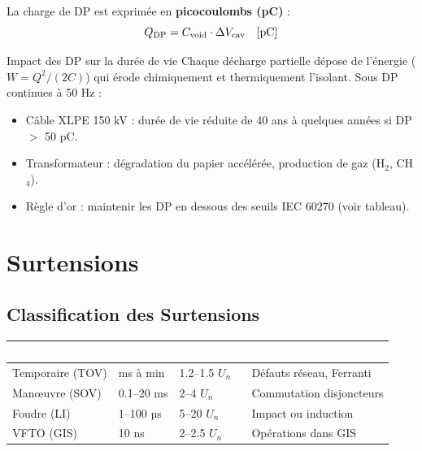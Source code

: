 \documentclass[12pt, a4paper, twoside]{report}
\begin{document}
La charge de DP est exprimée en \textbf{picocoulombs (pC)} :
\begin{equation}
  Q_{\rm DP} = C_{\rm void} \cdot \Delta V_{\rm cav} \quad [\si{pC}]
\end{equation}

\begin{warnbox}{Impact des DP sur la durée de vie}
Chaque décharge partielle dépose de l'énergie ($W = Q^2/(2C)$) qui érode chimiquement
et thermiquement l'isolant. Sous DP continues à 50 Hz :
\begin{itemize}
  \item Câble XLPE 150 kV : durée de vie réduite de 40 ans à quelques années si DP $>$ 50 pC.
  \item Transformateur : dégradation du papier accélérée, production de gaz (H$_2$, CH$_4$).
  \item Règle d'or : maintenir les DP en dessous des seuils IEC 60270 (voir tableau).
\end{itemize}
\end{warnbox}

\chapter{Surtensions}

\section{Classification des Surtensions}

\begin{center}
\begin{tabular}{llll}
\toprule
\rowcolor{darkblue}
\textcolor{white}{\textbf{Type}} &
\textcolor{white}{\textbf{Durée}} &
\textcolor{white}{\textbf{Amplitude}} &
\textcolor{white}{\textbf{Origine}} \\
\midrule
Temporaire (TOV)      & ms à min  & 1.2--1.5 $U_n$ & Défauts réseau, Ferranti \\
\rowcolor{lightgray}
Manœuvre (SOV)        & 0.1--20 ms & 2--4 $U_n$     & Commutation disjoncteurs \\
Foudre (LI)           & 1--100 µs  & 5--20 $U_n$    & Impact ou induction \\
\rowcolor{lightgray}
VFTO (GIS)            & 10 ns      & 2--2.5 $U_n$   & Opérations dans GIS \\
\bottomrule
\end{tabular}
\end{center}
\end{document}
